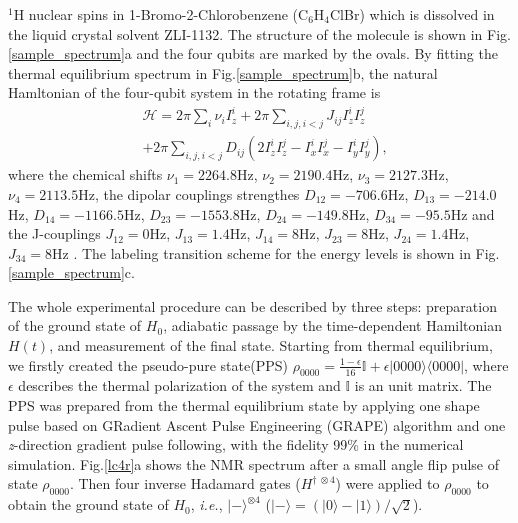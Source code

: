 \documentclass[twocolumn,showpacs,twoside,10pt,prl]{revtex4}
\begin{document}
$^1$H nuclear spins in 1-Bromo-2-Chlorobenzene (C$_6$H$_4$ClBr)
which is dissolved in the liquid crystal solvent ZLI-1132. The
structure of the molecule is shown in Fig.\ref{sample_spectrum}a and
the four qubits are marked by the ovals. By fitting the thermal
equilibrium spectrum in Fig.\ref{sample_spectrum}b, the natural
Hamltonian of the four-qubit system in the rotating frame is
\begin{eqnarray}
 &\mathcal{H} = 2\pi\sum_i \nu_i
 I_z^i+2\pi\sum_{i,j,i<j}J_{ij}I_z^iI_z^j \nonumber\\
 &+2\pi\sum_{i,j,i<j}D_{ij}(2I_z^iI_z^j-I_x^iI_x^j-I_y^iI_y^j),
\end{eqnarray}
where the chemical shifts $\nu_1=2264.8$Hz, $\nu_2=2190.4$Hz,
$\nu_3=2127.3$Hz, $\nu_4=2113.5$Hz, the dipolar couplings strengthes
$D_{12}=-706.6 $Hz, $D_{13}=-214.0$Hz, $D_{14}= -1166.5$Hz,
$D_{23}=-1553.8$Hz, $D_{24}=-149.8$Hz, $D_{34}=  -95.5$Hz and the
J-couplings $J_{12}=0$Hz, $J_{13}=1.4$Hz, $J_{14}=8$Hz,
$J_{23}=8$Hz, $J_{24}=1.4$Hz, $J_{34}=8$Hz . The labeling transition
scheme for the energy levels is shown in Fig.\ref{sample_spectrum}c.

The whole experimental procedure can be 
described by three steps: preparation of the ground state of $H_0$, adiabatic passage by the time-dependent Hamiltonian
$H(t)$, and measurement of the final state. Starting from thermal
equilibrium, we firstly created the pseudo-pure state(PPS) $\rho
_{0000}=\frac{1-\epsilon }{16}\mathbb{I}+\epsilon |0000\rangle
\langle 0000|$, where
$\epsilon$ describes the thermal polarization of the system and
${\mathbb{{I}}}$ is an unit matrix. The PPS was prepared from the thermal
equilibrium state by applying one shape pulse based on GRadient Ascent Pulse Engineering (GRAPE) algorithm\cite{Khaneja} and one \emph{z}-direction gradient pulse following, with the fidelity 99\% in the numerical simulation.
Fig.\ref{lc4r}a shows the NMR spectrum after a small angle flip
pulse\cite{smallangle} of state $\rho _{0000}$. Then four inverse
Hadamard gates ($H^{\dag~\otimes4}$) were applied  to $\rho
_{0000}$ to obtain the ground state of
$H_0$, \emph{i.e.}, $|-\rangle^{\otimes4}$
($|-\rangle=(|0\rangle-|1\rangle)/\sqrt{2}$).
\end{document}
